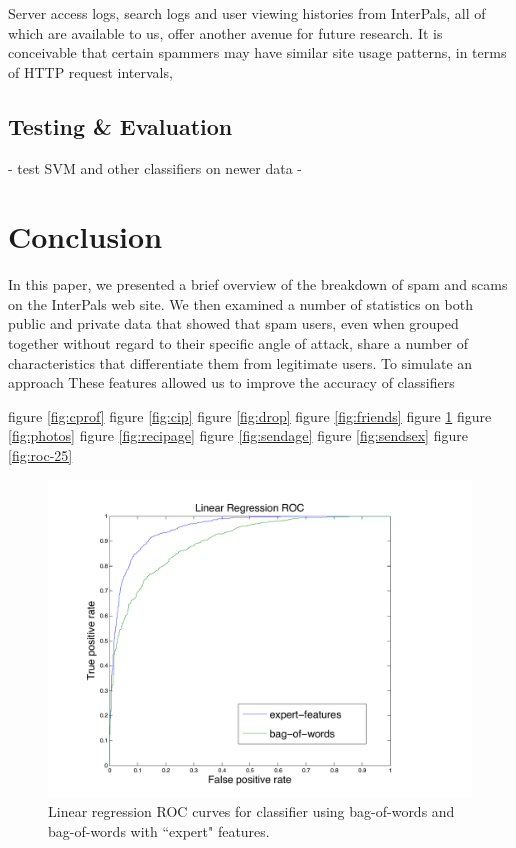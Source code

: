 \documentclass[preprint]{acm_proc_article-sp}
\begin{document}
Server access logs, search logs and user viewing histories from InterPals, all of which are available to us, offer another avenue for future research. It is conceivable that certain spammers may have similar site usage patterns, in terms of HTTP request intervals, 


\subsection{Testing \& Evaluation}

- test SVM and other classifiers on newer data
- 

\section{Conclusion}

In this paper, we presented a brief overview of the breakdown of spam and scams on the InterPals web site. 
We then examined a number of statistics on both public and private data that showed that spam users, even when 
grouped together without regard to their specific angle of attack, share a number of characteristics that differentiate 
them from legitimate users. To simulate an approach 
These features allowed us to improve the accuracy of classifiers



figure \ref{fig:cprof}
figure \ref{fig:cip}
figure \ref{fig:drop}
figure \ref{fig:friends}
figure \ref{fig:roclin}
figure \ref{fig:photos}
figure \ref{fig:recipage}
figure \ref{fig:sendage}
figure \ref{fig:sendsex}
figure \ref{fig:roc-25}


\begin{figure}[h]
    \centering
    \includegraphics[width=\linewidth]{figures/linear-roc.pdf}
    \caption{Linear regression ROC curves for classifier using bag-of-words and bag-of-words with ``expert" features.}
    \label{fig:roclin}
\end{figure}
\end{document}
